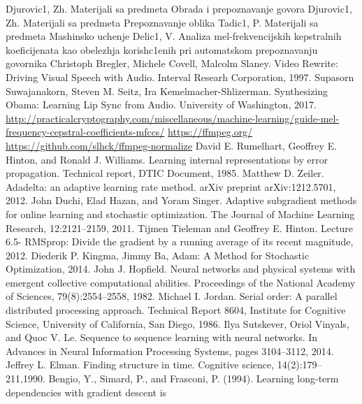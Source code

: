 \documentclass[a4paper, openany, oneside, 11pt]{book}
\begin{document}
\begin{thebibliography}{99}
Djurovic1, Zh. Materijali sa predmeta Obrada i prepoznavanje govora
Djurovic1, Zh. Materijali sa predmeta Prepoznavanje oblika
Tadic1, P. Materijali sa predmeta Mashinsko uchenje
Delic1, V. Analiza mel-frekvencijskih kepstralnih koeficijenata kao obelezhja korish\-c1enih pri automat\-skom prepoznavanju govornika
\selectfont
{}
Christoph Bregler, Michele Covell, Malcolm Slaney. Video Rewrite: Driving Visual Speech with Audio. Interval Researh Corporation, 1997.
Supasorn Suwajanakorn, Steven M. Seitz, Ira Kemelmacher-Shlizerman. Synthesizing Obama: Learning Lip Sync from Audio. University of Washington, 2017.
\url{http://practicalcryptography.com/miscellaneous/machine-learning/guide-mel-frequency-cepstral-coefficients-mfccs/}
\url{https://ffmpeg.org/}
\url{https://github.com/slhck/ffmpeg-normalize}
David E. Rumelhart, Geoffrey E. Hinton, and Ronald J. Williams. Learning
internal representations by error propagation. Technical report, DTIC Document, 1985.
Matthew D. Zeiler. Adadelta: an adaptive learning rate method. arXiv preprint arXiv:1212.5701, 2012.
John Duchi, Elad Hazan, and Yoram Singer. Adaptive subgradient methods for
online learning and stochastic optimization. The Journal of Machine Learning Research, 12:2121–2159, 2011.
Tijmen Tieleman and Geoffrey E. Hinton. Lecture 6.5- RMSprop: Divide
the gradient by a running average of its recent magnitude, 2012.
Diederik P. Kingma, Jimmy Ba, Adam: A Method for Stochastic Optimization, 2014.
John J. Hopfield. Neural networks and physical systems with emergent collective
computational abilities. Proceedings of the National Academy of Sciences, 79(8):2554–2558, 1982.
Michael I. Jordan. Serial order: A parallel distributed processing approach.
Technical Report 8604, Institute for Cognitive Science, University of California, San Diego, 1986.
Ilya Sutskever, Oriol Vinyals, and Quoc V. Le. Sequence to sequence learning
with neural networks. In Advances in Neural Information Processing Systems,
pages 3104–3112, 2014.
Jeffrey L. Elman. Finding structure in time. Cognitive science, 14(2):179–211,1990.
Bengio, Y., Simard, P., and Frasconi, P. (1994). Learning long-term dependencies with gradient descent is

\end{thebibliography}
\end{document}

